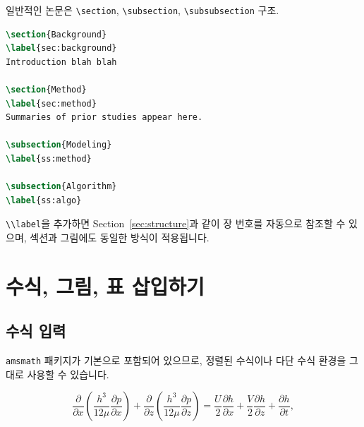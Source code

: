 \documentclass[doctor, korean]{pnuthesis_me}
\begin{document}
일반적인 논문은 \verb|\section|, \verb|\subsection|, \verb|\subsubsection| 구조.
\begin{lstlisting}[language=TeX]
\section{Background}
\label{sec:background}
Introduction blah blah

\section{Method}
\label{sec:method}
Summaries of prior studies appear here.

\subsection{Modeling}
\label{ss:method}

\subsection{Algorithm}
\label{ss:algo}

\end{lstlisting}

\verb|\\label|을 추가하면 Section~\ref{sec:structure}과 같이 장 번호를 자동으로 참조할 수 있으며, 섹션과 그림에도 동일한 방식이 적용됩니다.


\chapter{수식, 그림, 표 삽입하기}

\section{수식 입력}
\texttt{amsmath} 패키지가 기본으로 포함되어 있으므로, 정렬된 수식이나 다단 수식 환경을 그대로 사용할 수 있습니다.

\begin{equation}\label{eq:Rey}
    \frac{\partial}{\partial x} \left( \frac{h^3}{12 \mu} \frac{\partial p}{\partial x} \right) + 
    \frac{\partial}{\partial z} \left( \frac{h^3}{12 \mu} \frac{\partial p}{\partial z} \right) = 
    \frac{U}{2} \frac{\partial h}{\partial x} +
    \frac{V}{2} \frac{\partial h}{\partial z} +
    \frac{\partial h}{\partial t},
\end{equation}
\end{document}
